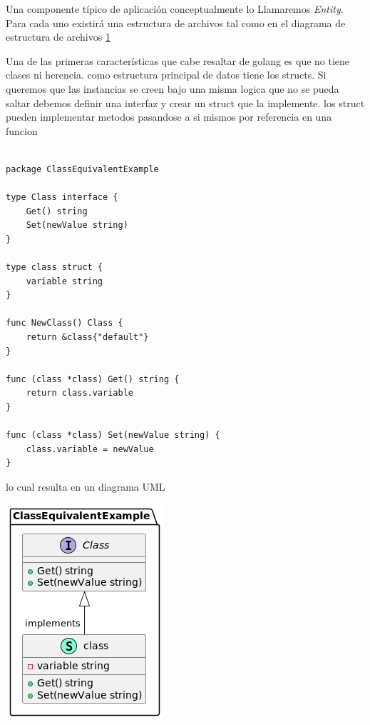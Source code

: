 Una componente típico de aplicación conceptualmente lo Llamaremos \textit{Entity}. Para cada uno existirá una estructura de archivos tal como en el diagrama de estructura de archivos \ref{fig:folderEntity}

\begin{figure}[h]
    \caption{}
    \label{fig:folderEntity}
\end{figure}

Una de las primeras características que cabe resaltar de golang es que no tiene clases ni herencia. como estructura
principal de datos tiene los structs. Si queremos que las instancias se creen bajo una misma logica que no se pueda saltar
debemos definir una interfaz y crear un struct que la implemente. los struct pueden implementar metodos pasandose a si mismos por referencia en una funcion

\begin{lstlisting}[label={lst:lstlisting}]

package ClassEquivalentExample

type Class interface {
	Get() string
	Set(newValue string)
}

type class struct {
	variable string
}

func NewClass() Class {
	return &class{"default"}
}

func (class *class) Get() string {
	return class.variable
}

func (class *class) Set(newValue string) {
	class.variable = newValue
}

\end{lstlisting}

lo cual resulta en un diagrama UML

\includegraphics{part/memoria_descriptiva/ClassEquivalentInGolang}

